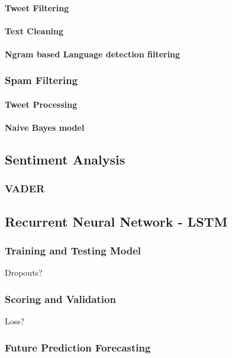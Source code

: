 \documentclass[oneside, 10pt]{article}
\begin{document}
				\paragraph{Tweet Filtering}
				\paragraph{Text Cleaning}
				\paragraph{Ngram based Language detection filtering}
			
			\subsubsection{Spam Filtering}
				\paragraph{Tweet Processing}
				\paragraph{Naive Bayes model}
		
		\subsection{Sentiment Analysis}
			\subsubsection{VADER}
			
		\subsection{Recurrent Neural Network - LSTM}
			\subsubsection{Training and Testing Model}
			Dropouts?
			\subsubsection{Scoring and Validation}
			Loss?
			\subsubsection{Future Prediction Forecasting}
			
	\newpage
	
\end{document}
